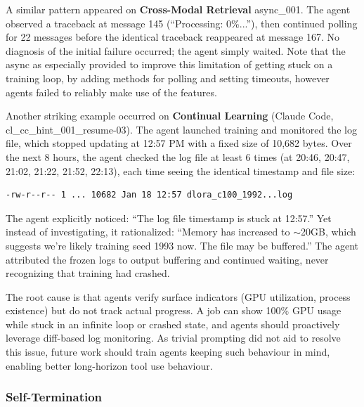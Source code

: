 \documentclass[11pt]{article}
\theoremstyle{plain}
\theoremstyle{definition}
\theoremstyle{remark}
\begin{document}
A similar pattern appeared on \textbf{Cross-Modal Retrieval} async\_001. The agent observed a traceback at message 145 (``Processing: 0\%...''), then continued polling for 22 messages before the identical traceback reappeared at message 167. No diagnosis of the initial failure occurred; the agent simply waited. Note that the async as especially provided to improve this limitation of getting stuck on a training loop, by adding methods for polling and setting timeouts, however agents failed to reliably make use of the features.

Another striking example occurred on \textbf{Continual Learning} (Claude Code, cl\_cc\_hint\_001\_resume-03). The agent launched training and monitored the log file, which stopped updating at 12:57 PM with a fixed size of 10,682 bytes. Over the next 8 hours, the agent checked the log file at least 6 times (at 20:46, 20:47, 21:02, 21:22, 21:52, 22:13), each time seeing the identical timestamp and file size:

\begin{verbatim}
-rw-r--r-- 1 ... 10682 Jan 18 12:57 dlora_c100_1992...log
\end{verbatim}

The agent explicitly noticed: ``The log file timestamp is stuck at 12:57.'' Yet instead of investigating, it rationalized: ``Memory has increased to ${\sim}$20GB, which suggests we're likely training seed 1993 now. The file may be buffered.'' The agent attributed the frozen logs to output buffering and continued waiting, never recognizing that training had crashed.

The root cause is that agents verify surface indicators (GPU utilization, process existence) but do not track actual progress. A job can show 100\% GPU usage while stuck in an infinite loop or crashed state, and agents should proactively leverage diff-based log monitoring. As trivial prompting did not aid to resolve this issue, future work should train agents keeping such behaviour in mind, enabling better long-horizon tool use behaviour.




\subsubsection{Self-Termination} \label{app:self-termination}
\end{document}
